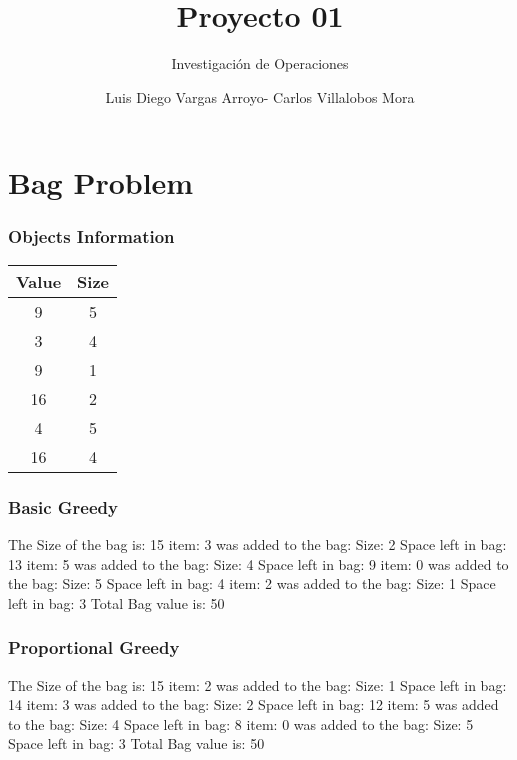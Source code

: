 \documentclass[12]{beamer}
\title{Proyecto 01}
\subtitle{Investigación de Operaciones}
\author{Luis Diego Vargas Arroyo- Carlos Villalobos Mora}
\begin{document}
\frame{\titlepage}
\section{Bag Problem}
\begin{frame}
\frametitle{Objects Information}

\begin{center}
\begin{adjustbox}{max width=\textwidth}
\small
\begin{tabular}{ |c|c| }
\hline
    Value     &     Size     \\\hline
\hline
  9  & 5 \\ 
\hline
  3  & 4 \\ 
\hline
  9  & 1 \\ 
\hline
  16  & 2 \\ 
\hline
  4  & 5 \\ 
\hline
  16  & 4 \\ 
\hline
\end{tabular}
\end{adjustbox}
\end{center}

\end{frame}
\begin{frame}
\frametitle{Basic Greedy}

\begin{flushleft}
\small
\small
\large 
The Size of the bag is:  15 
\newline 
\newline 
\newline 
\small 
item: 3 was added to the bag: Size: 2  Space left in bag: 13 
\newline
item: 5 was added to the bag: Size: 4  Space left in bag: 9 
\newline
item: 0 was added to the bag: Size: 5  Space left in bag: 4 
\newline
item: 2 was added to the bag: Size: 1  Space left in bag: 3 
\newline
\newline 
\large 
Total Bag value is:  50 
\end{flushleft}

\end{frame}
\begin{frame}
\frametitle{Proportional Greedy}

\begin{flushleft}
\small
\small
\large 
The Size of the bag is:  15 
\newline 
\newline 
\newline 
\small 
item: 2 was added to the bag: Size: 1  Space left in bag: 14 
\newline
item: 3 was added to the bag: Size: 2  Space left in bag: 12 
\newline
item: 5 was added to the bag: Size: 4  Space left in bag: 8 
\newline
item: 0 was added to the bag: Size: 5  Space left in bag: 3 
\newline
\newline 
\large 
Total Bag value is:  50 
\end{flushleft}

\end{frame}
\end{document}
